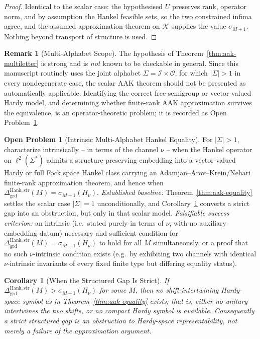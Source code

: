 \documentclass[12pt]{article}
\newtheorem{corollary}[theorem]{Corollary}
\theoremstyle{definition}
\newtheorem{remark}[theorem]{Remark}
\newtheorem{openproblem}[theorem]{Open Problem}
\newcommand{\DHankstr}{\Delta_{\mathrm{grd}}^{\mathrm{Hank,str}}}
\begin{document}
\begin{proof}
Identical to the scalar case: the hypothesised $U$ preserves rank, operator
norm, and by assumption the Hankel feasible sets, so the two constrained
infima agree, and the assumed approximation theorem on $\mathcal K$ supplies
the value $\sigma_{M+1}$.  Nothing beyond transport of structure is used.
\end{proof}

\begin{remark}[Multi-Alphabet Scope]
\label{rem:aak-multialphabet-scope}
The hypothesis of Theorem~\ref{thm:aak-multiletter} is strong and is
\emph{not} known to be checkable in general.  Since this manuscript routinely
uses the joint alphabet $\Sigma=\mathcal I\times\mathcal O$, for which
$|\Sigma|>1$ in every nondegenerate case, the scalar AAK theorem should not be
presented as automatically applicable.  Identifying the correct free-semigroup
or vector-valued Hardy model, and determining whether finite-rank AAK
approximation survives the equivalence, is an operator-theoretic
problem; it is recorded as
Open Problem~\ref{open:hankel-multiletter}.
\end{remark}

\begin{openproblem}[Intrinsic Multi-Alphabet Hankel Equality]
\label{open:hankel-multiletter}
For $|\Sigma|>1$, characterize intrinsically -- in terms of the channel $\nu$
-- when the Hankel operator on $\ell^2(\Sigma^*)$ admits a structure-preserving
embedding into a vector-valued Hardy or full Fock space Hankel class carrying
an Adamjan--Arov--Krein/Nehari finite-rank approximation theorem, and hence
when $\DHankstr(M)=\sigma_{M+1}(H_\nu)$.  \emph{Established baseline:}
Theorem~\ref{thm:aak-equality} settles the scalar case $|\Sigma|=1$
unconditionally, and Corollary~\ref{cor:hankel-strict} converts a strict
gap into an obstruction, but only in that scalar model.
\emph{Falsifiable success criterion:} an intrinsic (i.e.\ stated purely in
terms of $\nu$, with no auxiliary embedding datum) necessary and sufficient
condition for $\DHankstr(M)=\sigma_{M+1}(H_\nu)$ to hold for all $M$
simultaneously, or a proof that no such $\nu$-intrinsic condition exists
(e.g.\ by exhibiting two channels with identical $\nu$-intrinsic invariants
of every fixed finite type but differing equality status).
\end{openproblem}

\begin{corollary}[When the Structured Gap Is Strict]
\label{cor:hankel-strict}
If $\DHankstr(M)>\sigma_{M+1}(H_\nu)$ for some $M$, then no
\emph{shift-intertwining} Hardy-space symbol as in
Theorem~\ref{thm:aak-equality} exists; that is, either no unitary intertwines
the two shifts, or no compact Hardy symbol is available.  Consequently a strict
structured gap is an obstruction to Hardy-space representability, not merely a
failure of the approximation argument.
\end{corollary}
\end{document}
